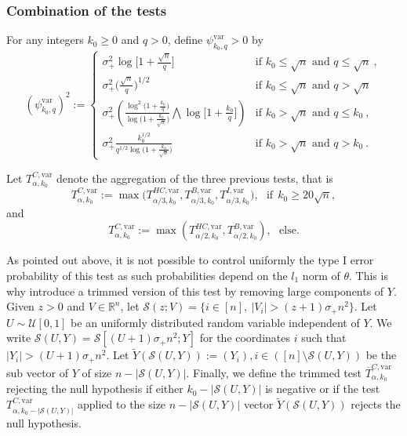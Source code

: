 \documentclass[twoside,11pt]{article}
\def\beq{\begin{equation}}
\def\eeq{\end{equation}}
\def\cS{\mathcal{S}}
\def\cU{\mathcal{U}}
\newcommand{\<}{\langle}
\renewcommand{\>}{\rangle}
\begin{document}
 
 \subsubsection{Combination of the tests}\label{sec:combination_uv}
 
 
 
For any integers $k_0\geq 0$ and $q>0$, define $\psi_{k_0,q}^{\mathrm{var}}>0$ by 
\beq \label{eq:upper_distance_linftyuv}
(\psi^{\mathrm{var}}_{k_0,q})^2:= \left\{\begin{array}{cc}
\sigma_+^2\log\Big[1+ \frac{\sqrt{n}}{q}\Big] & \text{if }k_0\leq \sqrt{n} \text{ and }q\leq \sqrt{n}\ ,\\
\sigma_+^2\big(\frac{\sqrt{n}}{q}\big)^{1/2} & \text{if }k_0\leq \sqrt{n} \text{ and }q> \sqrt{n}\\
\sigma_+^2\left(\frac{\log^2\big(1+  \tfrac{k_0}{q}\big)}{\log\big(1+\frac{ k_0}{\sqrt{n}}\big)} \bigwedge \log\Big[1+ \frac{k_0}{q}\Big]\right) & \text{if }k_0 > \sqrt{n} \text{ and }q\leq k_0\ ,\\
\sigma_+^2\frac{k^{1/2}_0}{q^{1/2}\log\big(1+\frac{ k_0}{\sqrt{n}}\big)} & \text{if }k_0 > \sqrt{n} \text{ and }q> k_0\ .
                          \end{array}\right.
\eeq


 
 
 
 
 
Let $T^{C,\mathrm{var}}_{\alpha,k_0}$ denote the aggregation of the three previous tests, that is $$T^{C,\mathrm{var}}_{\alpha,k_0}:=\max\big(T^{HC,\mathrm{var}}_{\alpha/3,k_0},T^{B,\mathrm{var}}_{\alpha/3,k_0},T^{I,\mathrm{var}}_{\alpha/3,k_0}\Big),~~~\text{if}~~k_0\geq 20\sqrt{n},$$ 
and $$T^{C,\mathrm{var}}_{\alpha,k_0}:=\max(T^{HC,\mathrm{var}}_{\alpha/2,k_0},T^{B,\mathrm{var}}_{\alpha/2,k_0}),~~~\text{else.}$$


As pointed out above, it is not possible to control uniformly the type I error probability of this test as such probabilities depend on the $l_1$ norm of $\theta$. This is why introduce a trimmed version of this test by removing large components of $Y$. Given $z>0$ and $V\in \mathbb{R}^n$, let $\cS(z;V)= \{i\in [n],\ |V_i|> (z+1) \sigma_+n^2 \}$. Let $U \sim \cU[0,1]$ be an uniformly distributed random variable independent of $Y$. We write $\cS(U,Y)= \cS[(U+1)\sigma_+ n^2;Y]$ for the coordinates $i$ such that $|Y_i|>(U+1)\sigma_+ n^2$. Let $\widetilde{Y}(\cS(U,Y)):=(Y_i), i\in ([n]\setminus \cS(U,Y))$ be the sub vector of $Y$ of size $n - |\cS(U,Y)|$. Finally, we define
the trimmed test  $\overline{T}^{C,\mathrm{var}}_{\alpha,k_0}$  rejecting the null hypothesis if either $k_0 - |\cS(U,Y)|$ is negative or if the test
$T^{C,\mathrm{var}}_{\alpha,k_0 - |\cS(U,Y)|}$ applied to the size $ n - |\cS(U,Y)|$ vector $\widetilde{Y}(\cS(U,Y))$  rejects the null hypothesis.
\end{document}
